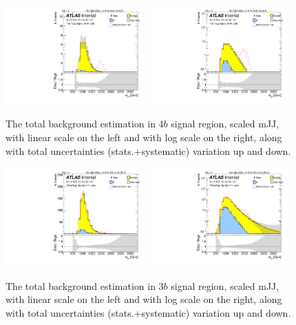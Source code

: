 \begin{figure}
\begin{center}
\includegraphics[width=0.48\textwidth,angle=-90]{figures/boosted/Signal_Syst/Moriond_bkg_9_FourTag_Signal_mHH_pole_blind.pdf}
\includegraphics[width=0.48\textwidth,angle=-90]{figures/boosted/Signal_Syst/Moriond_bkg_9_FourTag_Signal_mHH_pole_1_blind.pdf}
\caption{The total background estimation in $4b$ signal region, scaled mJJ, with linear scale on the left and with log scale on the right, along with total uncertainties (stats.$+$systematic) variation up and down.}
\label{fig:FinalBkg_sys-4b-pole}
\end{center}
\end{figure}


\begin{figure}
\begin{center}
\includegraphics[width=0.48\textwidth,angle=-90]{figures/boosted/Signal_Syst/Moriond_bkg_9_ThreeTag_Signal_mHH_pole_blind.pdf}
\includegraphics[width=0.48\textwidth,angle=-90]{figures/boosted/Signal_Syst/Moriond_bkg_9_ThreeTag_Signal_mHH_pole_1_blind.pdf}
\caption{The total background estimation in $3b$ signal region, scaled mJJ, with linear scale on the left and with log scale on the right, along with total uncertainties (stats.$+$systematic) variation up and down.}
\label{fig:FinalBkg_sys-3b-pole}
\end{center}
\end{figure}


